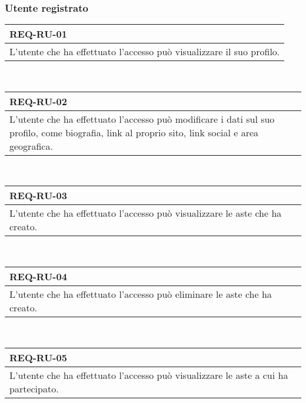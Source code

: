             \subsubsection{Utente registrato}
                \begin{tabular}{|p{}|}
                    \hline
                    \multicolumn{1}{|l|}{\cellcolor{head}\textbf{REQ-RU-01}} \\
                    \hline
                    L'utente che ha effettuato l'accesso può visualizzare il suo profilo. \\
                    \hline
                \end{tabular} \smallskip \\
                \begin{tabular}{|p{}|}
                    \hline
                    \multicolumn{1}{|l|}{\cellcolor{head}\textbf{REQ-RU-02}} \\
                    \hline
                    L'utente che ha effettuato l'accesso può modificare i dati sul suo profilo, come biografia, link al proprio sito, link social e area geografica. \\
                    \hline
                \end{tabular} \smallskip \\
                \begin{tabular}{|p{}|}
                    \hline
                    \multicolumn{1}{|l|}{\cellcolor{head}\textbf{REQ-RU-03}} \\
                    \hline
                    L'utente che ha effettuato l'accesso può visualizzare le aste che ha creato. \\
                    \hline
                \end{tabular} \smallskip \\
                \begin{tabular}{|p{}|}
                    \hline
                    \multicolumn{1}{|l|}{\cellcolor{head}\textbf{REQ-RU-04}} \\
                    \hline
                    L'utente che ha effettuato l'accesso può eliminare le aste che ha creato. \\
                    \hline
                \end{tabular} \smallskip \\
                \begin{tabular}{|p{}|}
                    \hline
                    \multicolumn{1}{|l|}{\cellcolor{head}\textbf{REQ-RU-05}} \\
                    \hline
                    L'utente che ha effettuato l'accesso può visualizzare le aste a cui ha partecipato. \\
                    \hline
                \end{tabular} \smallskip \\
